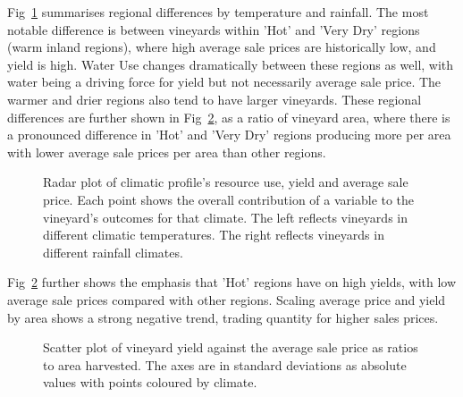 \documentclass[10pt,letterpaper]{article}
\begin{document}
%
%
%
%
%
%
%
%
%

Fig~\ref{fig:spider} summarises regional differences by temperature and rainfall. The most notable difference is between vineyards within 'Hot' and 'Very Dry' regions (warm inland regions), where high average sale prices are historically low, and yield is high. Water Use changes dramatically between these regions as well, with water being a driving force for yield but not necessarily average sale price. The warmer and drier regions also tend to have larger vineyards. These regional differences are further shown in Fig~\ref{fig:yield_vs_value_area}, as a ratio of vineyard area, where there is a pronounced difference in 'Hot' and 'Very Dry' regions producing more per area with lower average sale prices per area than other regions.
\par
\begin{figure}[!ht]
  \caption{Radar plot of climatic profile's resource use, yield and average sale price. Each point shows the overall contribution of a variable to the vineyard's outcomes for that climate. The left reflects vineyards in different climatic temperatures. The right reflects vineyards in different rainfall climates.}\label{fig:spider}
\end{figure}

Fig~\ref{fig:yield_vs_value_area} further shows the emphasis that 'Hot' regions have on high yields, with low average sale prices compared with other regions. Scaling average price and yield by area shows a strong negative trend, trading quantity for higher sales prices.
\par
\begin{figure}[!ht]
    \caption{Scatter plot of vineyard yield against the average sale price as ratios to area harvested. The axes are in standard deviations as absolute values with points coloured by climate.}\label{fig:yield_vs_value_area}
\end{figure}
\end{document}

